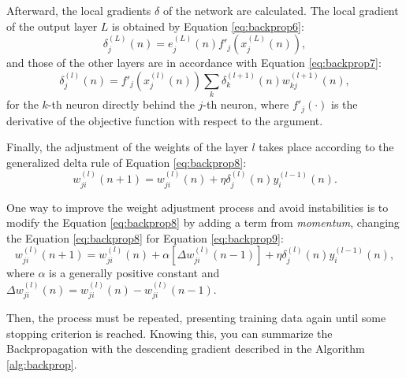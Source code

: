 Afterward, the local gradients $\delta$ of the network are calculated. The local gradient of the output layer $L$ is obtained by Equation \ref{eq:backprop6}:
\begin{equation}
    \label{eq:backprop6}
    \delta_j^{(L)} (n) = e_j^{(L)}(n) {f}'_j (x_j^{(L)}(n)),
\end{equation}
and those of the other layers are in accordance with Equation \ref{eq:backprop7}:
\begin{equation}
    \label{eq:backprop7}
    \delta_j^{(l)} (n) = {f}'_j (x_j^{(l)}(n)) \sum_k \delta_k^{(l+1)} (n) w_{kj}^{(l+1)}(n),
\end{equation}
for the $k$-th neuron directly behind the $j$-th neuron, where ${f}'_j(\cdot)$ is the derivative of the objective function with respect to the argument.

Finally, the adjustment of the weights of the layer $l$ takes place according to the generalized delta rule of Equation \ref{eq:backprop8}:
\begin{equation}
    \label{eq:backprop8}
    w_{ji}^{(l)} (n+1) = w_{ji}^{(l)}(n) + \eta \delta_j^{(l)}(n) y_i^{(l-1)} (n).
\end{equation}

One way to improve the weight adjustment process and avoid instabilities is to modify the Equation \ref{eq:backprop8} by adding a term from \textit{momentum}, changing the Equation \ref{eq:backprop8} for Equation \ref{eq:backprop9}:
\begin{equation}
\label{eq:backprop9}
    w_{ji}^{(l)} (n+1) = w_{ji}^{(l)}(n) + \alpha[\Delta w_{ji}^{(l)}(n-1)] + \eta \delta_j^{(l)}(n) y_i^{(l-1)} (n),
\end{equation}
where $\alpha$ is a generally positive constant and $\Delta w_{ji}^{(l)}(n) = w_{ji}^{(l)}(n) - w_{ji}^{(l)}(n-1)$.


Then, the process must be repeated, presenting training data again until some stopping criterion is reached. Knowing this, you can summarize the Backpropagation with the descending gradient described in the Algorithm \ref{alg:backprop}.




